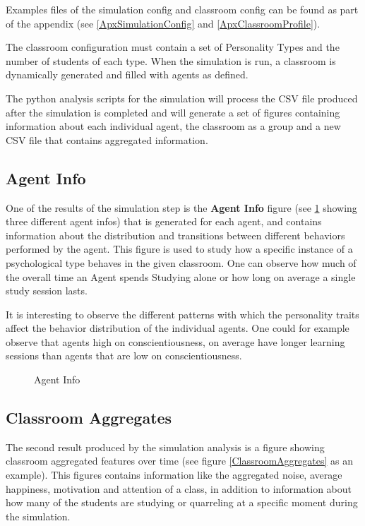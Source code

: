 Examples files of the simulation config and classroom config can be found as part of
the appendix (see \ref{ApxSimulationConfig} and \ref{ApxClassroomProfile}).

The classroom configuration must contain a set of Personality Types and the number
of students of each type. When the simulation is run, a classroom is dynamically
generated and filled with agents as defined.

The python analysis scripts for the simulation will process the CSV file produced
after the simulation is completed and will generate a set of figures containing information
about each individual agent, the classroom as a group and a new CSV file that contains
aggregated information.

\subsection{Agent Info}
One of the results of the simulation step is the \textbf{Agent Info} figure (see \ref{AgentInfo} showing
three different agent infos) that is generated for each agent, and contains information
about the distribution and transitions between different behaviors performed by the agent.
This figure is used to study how a specific instance of a psychological type behaves
in the given classroom. One can observe how much of the overall time an Agent
spends Studying alone or how long on average a single study session lasts.

\bb

It is interesting to observe the different patterns with which the personality traits
affect the behavior distribution of the individual agents. One could for example
observe that agents high on conscientiousness, on average have longer
learning sessions than agents that are low on conscientiousness.

\begin{figure}[H]
    \label{AgentInfo}
    \caption{Agent Info}
    \hspace*{-2.0\leftmargin}
\end{figure}

\subsection{Classroom Aggregates}
The second result produced by the simulation analysis is a figure showing classroom
aggregated features over time (see figure \ref{ClassroomAggregates} as an example).
This figures contains information like the aggregated noise, average happiness,
motivation and attention of a class, in addition to information about how many of
the students are studying or quarreling at a specific moment during the simulation.

